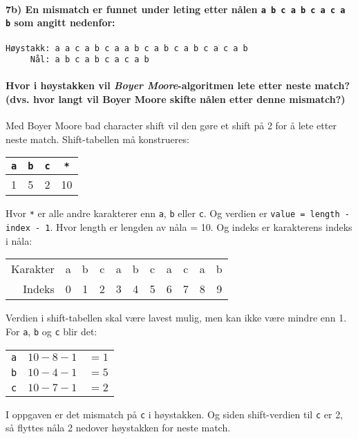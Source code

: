 \documentclass[11pt,a4paper]{article}
\theoremstyle{def}
\begin{document}
\paragraph{7b) En mismatch er funnet under leting etter nålen \texttt{a b c a b c a c a b} som angitt nedenfor:\vspace{-20pt}}
\begin{Verbatim}
Høystakk: a a c a b c a a b c a b c a b c a c a b
     Nål: a b c a b c a c a b
\end{Verbatim}
\vspace{-30pt}
\paragraph{Hvor i høystakken vil \textit{Boyer Moore}-algoritmen lete etter neste match? (dvs. hvor langt vil Boyer Moore skifte nålen etter denne mismatch?)}
Med Boyer Moore bad character shift vil den gøre et shift på 2 for å lete etter neste match. Shift-tabellen må konstrueres:

\begin{tabular}{cccc}
\texttt{a}&\texttt{b}&\texttt{c}&\texttt{*}\\
\hline
1&5&2&10
\end{tabular}

\noindent Hvor \texttt{*} er alle andre karakterer enn \texttt{a}, \texttt{b} eller \texttt{c}. Og verdien er \texttt{value = length - index - 1}. Hvor length er lengden av nåla = 10. Og indeks er karakterens indeks i nåla:

\begin{tabular}{rcccccccccc}
Karakter&a&b&c&a&b&c&a&c&a&b\\
Indeks&0&1&2&3&4&5&6&7&8&9\\
\end{tabular}

\noindent Verdien i shift-tabellen skal være lavest mulig, men kan ikke være mindre enn 1. For \texttt{a}, \texttt{b} og \texttt{c} blir det:

\begin{tabular}{ccc}
\texttt{a}&$10-8-1$&$=1$\\
\texttt{b}&$10-4-1$&$=5$\\
\texttt{c}&$10-7-1$&$=2$\\
\end{tabular}

\noindent I oppgaven er det mismatch på \texttt{c} i høystakken. Og siden shift-verdien til \texttt{c} er 2, så flyttes nåla 2 nedover høystakken for neste match.
\end{document}
